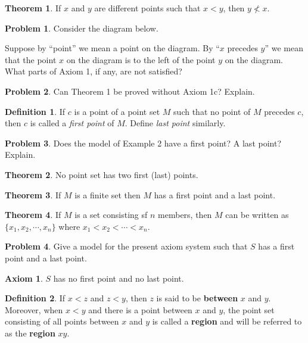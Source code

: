 \documentclass{article}
\theoremstyle{definition}
\newtheorem{definition}{Definition}
\newtheorem{axiom}{Axiom}
\newtheorem{theorem}{Theorem}
\theoremstyle{definition}
\newtheorem{problem}{Problem}
\theoremstyle{plain}
\begin{document}
\begin{theorem}
  If $x$ and $y$ are different points such that $x < y$, then $y \not< x$.
\end{theorem}

\begin{problem}
  Consider the diagram below.

  Suppose by ``point'' we mean a point on the diagram.  By ``$x$ precedes $y$''
  we mean that the point $x$ on the diagram is to the left of the point $y$ on
  the diagram.  What parts of Axiom 1, if any, are not satisfied?
\end{problem}

\begin{problem}
  Can Theorem 1 be proved without Axiom 1c?  Explain.
\end{problem}

\begin{definition}
  If $c$ is a point of a point set $M$ such that no point of $M$ precedes $c$,
  then $c$ is called a \emph{first point} of $M$.  Define \emph{last point}
  similarly.
\end{definition}

\begin{problem}
  Does the model of Example 2 have a first point?  A last point? Explain.
\end{problem}

\begin{theorem}
  No point set has two first (last) points.
\end{theorem}

\begin{theorem}
  If $M$ is a finite set then $M$ has a first point and a last point.
\end{theorem}

\begin{theorem}
  If $M$ is a set consisting sf $n$ members, then $M$ can be written as $\{x_1,
  x_2, \cdots, x_n\}$ where $x_1 < x_2 < \cdots < x_n$.
\end{theorem}

\begin{problem}
  Give a model for the present axiom system such that $S$ has a first point and
  a last point.
\end{problem}

\begin{axiom}
  $S$ has no first point and no last point.
\end{axiom}

\begin{definition}
  If $x < z$ and $z < y$, then $z$ is said to be \textbf{between} $x$ and $y$.
  Moreover, when $x < y$ and there is a point between $x$ and $y$, the point
  set consisting of all points between $x$ and $y$ is called a \textbf{region}
  and will be referred to as the \textbf{region} $xy$.
\end{definition}
\end{document}
